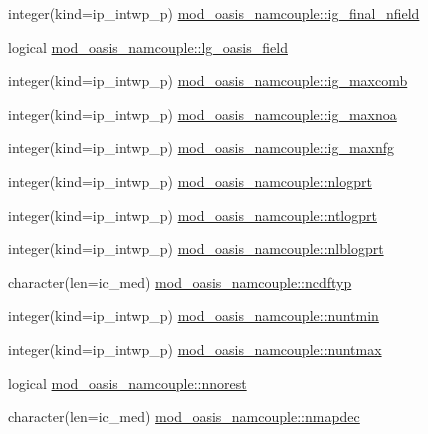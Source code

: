 \begin{DoxyCompactItemize}
\item 
integer(kind=ip\+\_\+intwp\+\_\+p) \hyperlink{namespacemod__oasis__namcouple_a7cf04d6fb678ee65b7fbedc56a0d680a}{mod\+\_\+oasis\+\_\+namcouple\+::ig\+\_\+final\+\_\+nfield}
\item 
logical \hyperlink{namespacemod__oasis__namcouple_aaf6b923ffc7763fd37a5c4c72bdfa34d}{mod\+\_\+oasis\+\_\+namcouple\+::lg\+\_\+oasis\+\_\+field}
\item 
integer(kind=ip\+\_\+intwp\+\_\+p) \hyperlink{namespacemod__oasis__namcouple_abba00866a740567bc1d93cf5850042fd}{mod\+\_\+oasis\+\_\+namcouple\+::ig\+\_\+maxcomb}
\item 
integer(kind=ip\+\_\+intwp\+\_\+p) \hyperlink{namespacemod__oasis__namcouple_ae66cf9f63b6c440406c9b675caef7759}{mod\+\_\+oasis\+\_\+namcouple\+::ig\+\_\+maxnoa}
\item 
integer(kind=ip\+\_\+intwp\+\_\+p) \hyperlink{namespacemod__oasis__namcouple_aab2d4bcc2dc767df51f99f907f4f3e6e}{mod\+\_\+oasis\+\_\+namcouple\+::ig\+\_\+maxnfg}
\item 
integer(kind=ip\+\_\+intwp\+\_\+p) \hyperlink{namespacemod__oasis__namcouple_a7b8c924fdea622759b99d8f61e03ade5}{mod\+\_\+oasis\+\_\+namcouple\+::nlogprt}
\item 
integer(kind=ip\+\_\+intwp\+\_\+p) \hyperlink{namespacemod__oasis__namcouple_a49bd874b06648257f7ce70da19a678b4}{mod\+\_\+oasis\+\_\+namcouple\+::ntlogprt}
\item 
integer(kind=ip\+\_\+intwp\+\_\+p) \hyperlink{namespacemod__oasis__namcouple_a13fcc269041aadb1f4dad9c46c1d76f8}{mod\+\_\+oasis\+\_\+namcouple\+::nlblogprt}
\item 
character(len=ic\+\_\+med) \hyperlink{namespacemod__oasis__namcouple_a7dec63f1624c3b60a8f45d8080919298}{mod\+\_\+oasis\+\_\+namcouple\+::ncdftyp}
\item 
integer(kind=ip\+\_\+intwp\+\_\+p) \hyperlink{namespacemod__oasis__namcouple_a9add83d816dc5cdb41c84747f4ee8962}{mod\+\_\+oasis\+\_\+namcouple\+::nuntmin}
\item 
integer(kind=ip\+\_\+intwp\+\_\+p) \hyperlink{namespacemod__oasis__namcouple_ab47490a015fa09cf75a760dadfeb0ff9}{mod\+\_\+oasis\+\_\+namcouple\+::nuntmax}
\item 
logical \hyperlink{namespacemod__oasis__namcouple_adb02545191d2ca9c1daff1a3ced2223f}{mod\+\_\+oasis\+\_\+namcouple\+::nnorest}
\item 
character(len=ic\+\_\+med) \hyperlink{namespacemod__oasis__namcouple_af56d31837b48a43e234bccbf1a3e2954}{mod\+\_\+oasis\+\_\+namcouple\+::nmapdec}

\end{DoxyCompactItemize}
